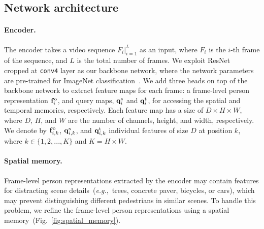 \documentclass[10pt,twocolumn,letterpaper]{article}
\begin{document}
	\vspace{-0.2cm}
	\subsection{Network architecture} \label{subsec:network_architecture}
	
		\vspace{-0.1cm}
		\paragraph{Encoder.} \label{subsubsec:encoder}
		
			The encoder takes a video sequence $F_i|_{i=1}^L$ as an input, where $F_i$ is the $i$-th frame of the sequence, and $L$ is the total number of frames. We exploit ResNet~\cite{he2016deep} cropped at \texttt{conv4} layer as our backbone network, where the network parameters are pre-trained for ImageNet classification~\cite{krizhevsky2012imagenet}. We add three heads on top of the backbone network to extract feature maps for each frame: a frame-level person representation $\mathbf{f}^{\text o}_i$, and query maps, $\mathbf{q}^{\text s}_i$ and $\mathbf{q}^{\text t}_i$, for accessing the spatial and temporal memories, respectively. Each feature map has a size of $D \times H \times W$, where $D$, $H$, and $W$ are the number of channels, height, and width, respectively. We denote by $\mathbf{f}^{\text o}_{i,k}$, $\mathbf{q}^{\text s}_{i,k}$, and $\mathbf{q}^{\text t}_{i,k}$ individual features of size $D$ at position $k$, where $k \in \{ 1, 2, ..., K \}$ and $K = H \times W$.

		\vspace{-0.4cm}
		\paragraph{Spatial memory.} \label{subsubsec:spatial_memory}
		
			Frame-level person representations extracted by the encoder may contain features for distracting scene details~(\emph{e.g.},~trees, concrete paver, bicycles, or cars), which may prevent distinguishing different pedestrians in similar scenes. To handle this problem, we refine the frame-level person representations  using a spatial memory~(Fig.~\ref{fig:spatial_memory}).
			
\end{document}
